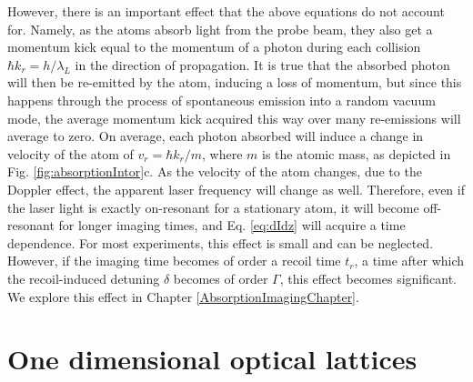 However, there is an important effect that the above equations do not account for. Namely, as the atoms absorb light from the probe beam, they also get a momentum kick equal to the momentum of a photon during each collision $\hbar k_r=h/\lambda_L$ in the direction of propagation. It is true that the absorbed photon will then be re-emitted by the atom, inducing a loss of momentum, but since this happens through the process of spontaneous emission into a random vacuum mode, the average momentum kick acquired this way over many re-emissions will average to zero. On average, each photon absorbed will induce a change in velocity of the atom of $v_r=\hbar k_r/m$, where $m$ is the atomic mass, as depicted in Fig. \ref{fig:absorptionIntor}c. As the velocity of the atom changes, due to the Doppler effect, the apparent laser frequency will change as well. Therefore, even if the laser light is exactly on-resonant for a stationary atom, it will become off-resonant for longer imaging times, and Eq. \ref{eq:dIdz} will acquire a time dependence. For most experiments, this effect is small and can be neglected. However, if the imaging time becomes of order a recoil time $t_r$, a time after which the recoil-induced detuning $\delta$ becomes of order $\Gamma$, this effect becomes significant. We explore this effect in Chapter \ref{AbsorptionImagingChapter}.  


\section{One dimensional optical lattices}\label{chap:4sec:1DOL}


